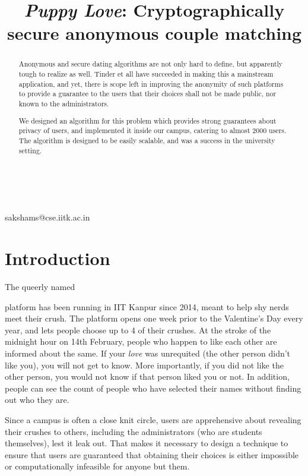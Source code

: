 \documentclass[sigtbd]{sigtbd-style}
\newcommand{\name}{\textit{Puppy Love}}
\begin{document}
\title{\name{}: Cryptographically secure anonymous couple matching}

%
%

{ \\
  \\
{sakshams@cse.iitk.ac.in}}

\maketitle
\begin{abstract}
  Anonymous and secure dating algorithms are not only hard to define,
  but apparently tough to realize as well. Tinder et all have
  succeeded in making this a mainstream application, and yet, there is
  scope left in improving the anonymity of such platforms to provide
  a guarantee to the users that their choices shall not be made
  public, nor known to the administrators.

  We designed an algorithm for this problem which provides strong
  guarantees about privacy of users, and implemented it inside our
  campus, catering to almost 2000 users. The algorithm is designed to
  be easily scalable, and was a success in the university setting.
\end{abstract}

\section{Introduction}

The queerly named \title{} platform has been running in IIT Kanpur
since 2014, meant to help shy nerds meet their crush. The platform
opens one week prior to the Valentine's Day every year, and lets people
choose up to 4 of their crushes. At the stroke of the midnight hour on
14th February, people who happen to like each other are informed about
the same. If your \textit{love} was unrequited (the other person
didn't like you), you will not get to know. More importantly, if you
did not like the other person, you would not know if that person liked
you or not. In addition, people can see the count of people who have
selected their names without finding out who they are.

Since a campus is often a close knit circle, users are apprehensive
about revealing their crushes to others, including the administrators
(who are students themselves), lest it leak out. That makes it
necessary to design a technique to ensure that users are guaranteed
that obtaining their choices is either impossible or computationally
infeasible for anyone but them.
\end{document}
